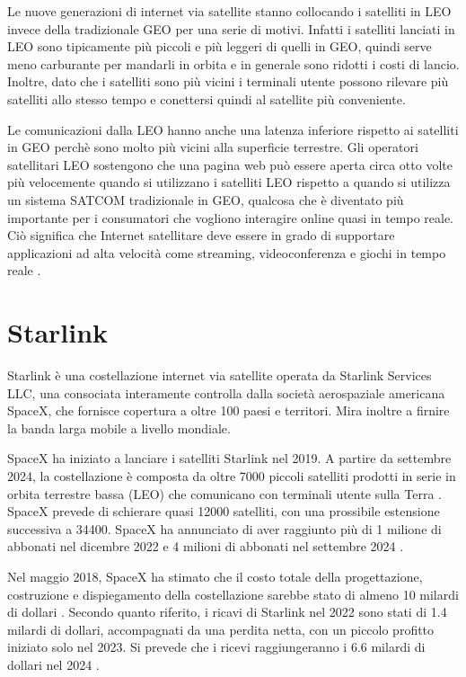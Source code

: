 Le nuove generazioni di internet via satellite stanno collocando i satelliti in \ac{LEO} invece della tradizionale \ac{GEO} per una serie di motivi.
Infatti i satelliti lanciati in \ac{LEO} sono tipicamente più piccoli e più leggeri di quelli in \ac{GEO}, quindi serve meno carburante per mandarli in orbita e in generale sono ridotti i costi di lancio.
Inoltre, dato che i satelliti sono più vicini i terminali utente possono rilevare più satelliti allo stesso tempo e conettersi quindi al satellite più conveniente.

Le comunicazioni dalla \ac{LEO} hanno anche una latenza inferiore rispetto ai satelliti in \ac{GEO} perchè sono molto più vicini alla superficie terrestre.
Gli operatori satellitari \ac{LEO} sostengono che una pagina web può essere aperta circa otto volte più velocemente quando si utilizzano i satelliti \ac{LEO} rispetto a quando si utilizza un sistema SATCOM tradizionale in \ac{GEO}, qualcosa che è diventato più importante per i consumatori che vogliono interagire online quasi in tempo reale.
Ciò significa che Internet satellitare deve essere in grado di supportare applicazioni ad alta velocità come streaming, videoconferenza e giochi in tempo reale \cite{makena_young_low_2022}.

\section{Starlink}

Starlink è una costellazione internet via satellite operata da Starlink Services LLC, una consociata interamente controlla dalla società aerospaziale americana SpaceX, che fornisce copertura a oltre 100 paesi e territori.
Mira inoltre a firnire la banda larga mobile a livello mondiale.

SpaceX ha iniziato a lanciare i satelliti Starlink nel 2019.
A partire da settembre 2024, la costellazione è composta da oltre 7000 piccoli satelliti prodotti in serie in orbita terrestre bassa (\ac{LEO}) che comunicano con terminali utente sulla Terra \cite{jonathan_mcdowell_starlink_nodate}.
SpaceX prevede di schierare quasi 12000 satelliti, con una prossibile estensione successiva a 34400.
SpaceX ha annunciato di aver raggiunto più di 1 milione di abbonati nel dicembre 2022 e 4 milioni di abbonati nel settembre 2024 \cite{starlink_starlink_nodate}.

Nel maggio 2018, SpaceX ha stimato che il costo totale della progettazione, costruzione e dispiegamento della costellazione sarebbe stato di almeno 10 milardi di dollari \cite{michael_baylor_block_2018}.
Secondo quanto riferito, i ricavi di Starlink nel 2022 sono stati di 1.4 milardi di dollari, accompagnati da una perdita netta, con un piccolo profitto iniziato solo nel 2023.
Si prevede che i ricevi raggiungeranno i 6.6 milardi di dollari nel 2024 \cite{eric_berger_analyst_2024}.

